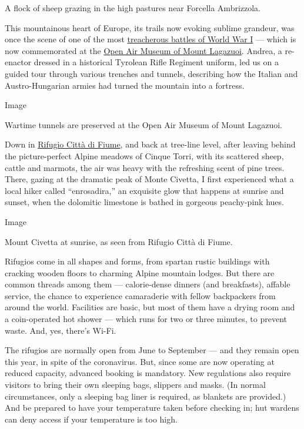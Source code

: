 A flock of sheep grazing in the high pastures near Forcella Ambrizzola.

This mountainous heart of Europe, its trails now evoking sublime
grandeur, was once the scene of one of the most
\href{https://www.smithsonianmag.com/history/most-treacherous-battle-world-war-i-italian-mountains-180959076/}{treacherous
battles of World War I} --- which is now commemorated at the
\href{https://lagazuoi.it/EN/Discover-History-page4-The-Open-Air-Museum-of-Mt-Lagazuoi}{Open
Air Museum of Mount Lagazuoi}. Andrea, a re-enactor dressed in a
historical Tyrolean Rifle Regiment uniform, led us on a guided tour
through various trenches and tunnels, describing how the Italian and
Austro-Hungarian armies had turned the mountain into a fortress.

Image

Wartime tunnels are preserved at the Open Air Museum of Mount Lagazuoi.

Down in \href{http://www.rifugiocittadifiume.it/?lang=en}{Rifugio Città
di Fiume}, and back at tree-line level, after leaving behind the
picture-perfect Alpine meadows of Cinque Torri, with its scattered
sheep, cattle and marmots, the air was heavy with the refreshing scent
of pine trees. There, gazing at the dramatic peak of Monte Civetta, I
first experienced what a local hiker called ``enrosadira,'' an exquisite
glow that happens at sunrise and sunset, when the dolomitic limestone is
bathed in gorgeous peachy-pink hues.

Image

Mount Civetta at sunrise, as seen from Rifugio Città di Fiume.

Rifugios come in all shapes and forms, from spartan rustic buildings
with cracking wooden floors to charming Alpine mountain lodges. But
there are common threads among them --- calorie-dense dinners (and
breakfasts), affable service, the chance to experience camaraderie with
fellow backpackers from around the world. Facilities are basic, but most
of them have a drying room and a coin-operated hot shower --- which runs
for two or three minutes, to prevent waste. And, yes, there's Wi-Fi.

The rifugios are normally open from June to September --- and they
remain open this year, in spite of the coronavirus. But, since some are
now operating at reduced capacity, advanced booking is mandatory. New
regulations also require visitors to bring their own sleeping bags,
slippers and masks. (In normal circumstances, only a sleeping bag liner
is required, as blankets are provided.) And be prepared to have your
temperature taken before checking in; hut wardens can deny access if
your temperature is too high.

